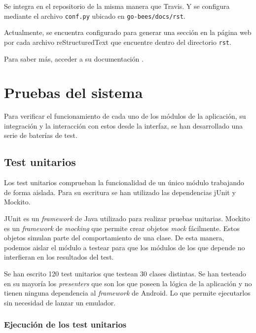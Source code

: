 Se integra en el repositorio de la misma manera que Travis. Y se
configura mediante el archivo \texttt{conf.py} ubicado en
\texttt{go-bees/docs/rst}.

Actualmente, se encuentra configurado para generar una sección en la
página web por cada archivo reStructuredText que encuentre dentro del
directorio \texttt{rst}.


Para saber más, acceder a su documentación \citep{readthedocs:doc}.

\section{Pruebas del sistema}\label{pruebas-del-sistema}

Para verificar el funcionamiento de cada uno de los módulos de la
aplicación, su integración y la interacción con estos desde la interfaz,
se han desarrollado una serie de baterías de test.

\subsection{Test unitarios}\label{test-unitarios}

Los test unitarios comprueban la funcionalidad de un único módulo
trabajando de forma aislada. Para su escritura se han utilizado las
dependencias jUnit y Mockito.

JUnit es un \emph{framework} de Java utilizado para realizar pruebas
unitarias. Mockito es un \emph{framework} de \emph{mocking} que permite
crear objetos \emph{mock} fácilmente. Estos objetos simulan parte del
comportamiento de una clase. De esta manera, podemos aislar el módulo a
testear para que los módulos de los que depende no interfieran en los
resultados del test.

Se han escrito 120 test unitarios que testean 30 clases distintas. Se
han testeado en su mayoría los \emph{presenters} que son los que poseen
la lógica de la aplicación y no tienen ninguna dependencia al
\emph{framework} de Android. Lo que permite ejecutarlos sin necesidad de
lanzar un emulador.


\subsubsection{Ejecución de los test
unitarios}\label{ejecucion-de-los-test-unitarios}

